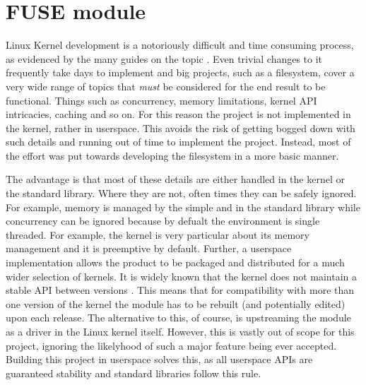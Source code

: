     \section{FUSE module}
        \label{sec_FUSE}

        Linux Kernel development is a notoriously difficult and time consuming
        process, as evidenced by the many guides on the topic
        \cite{kernelnewbies_developer} \cite{Linux_howto}. Even trivial changes
        to it frequently take days to implement and big projects, such as a
        filesystem, cover a very wide range of topics that \textit{must} be
        considered for the end result to be functional. Things such as
        concurrency, memory limitations, kernel API intricacies, caching and so
        on. For this reason the project is not implemented in the kernel,
        rather in userspace. This avoids the risk of getting bogged down with
        such details and running out of time to implement the project. Instead,
        most of the effort was put towards developing the filesystem in a more
        basic manner.

        The advantage is that most of these details are either handled in the
        kernel or the standard library. Where they are not, often times they
        can be safely ignored. For example, memory is managed by the simple
         and  in the standard library while
        concurrency can be ignored because by defualt the environment is single
        threaded. For example, the kernel is very particular about its memory
        management and it is preemptive by default. Further, a userspace
        implementation allows the product to be packaged and distributed for a
        much wider selection of kernels. It is widely known that the kernel
        does not maintain a stable API between versions
        \cite{Linux_stable_api}. This means that for compatibility with more
        than one version of the kernel the module has to be rebuilt (and
        potentially edited) upon each release. The alternative to this, of
        course, is upstreaming the module as a driver in the Linux kernel
        itself. However, this is vastly out of scope for this project, ignoring
        the likelyhood of such a major feature being ever accepted. Building
        this project in userspace solves this, as all userspace APIs are
        guaranteed stability \cite{never_break_userspace} and standard
        libraries follow this rule.

